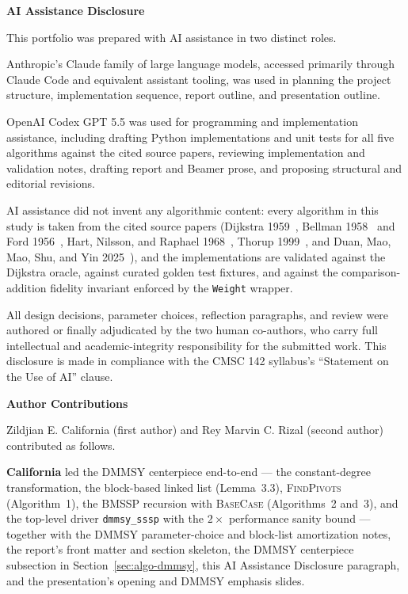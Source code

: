 \documentclass[12pt]{article}
\begin{document}
\newpage
\noindent\textbf{AI Assistance Disclosure}\label{sec:ai-disclosure}
\medskip

\begingroup
\setlength{\parskip}{6pt}

This portfolio was prepared with AI assistance in two distinct roles.

Anthropic's Claude family of large language models, accessed primarily through Claude Code and equivalent assistant tooling, was used in planning the project structure, implementation sequence, report outline, and presentation outline.

OpenAI Codex GPT 5.5 was used for programming and implementation assistance, including drafting Python implementations and unit tests for all five algorithms against the cited source papers, reviewing implementation and validation notes, drafting report and Beamer prose, and proposing structural and editorial revisions.

AI assistance did not invent any algorithmic content: every algorithm in this study is taken from the cited source papers (Dijkstra 1959~\cite{dijkstra1959note}, Bellman 1958~\cite{bellman1958routing} and Ford 1956~\cite{ford1956network}, Hart, Nilsson, and Raphael 1968~\cite{hart1968astar}, Thorup 1999~\cite{thorup1999linear}, and Duan, Mao, Mao, Shu, and Yin 2025~\cite{duan2025breaking}), and the implementations are validated against the Dijkstra oracle, against curated golden test fixtures, and against the comparison-addition fidelity invariant enforced by the \texttt{Weight} wrapper.

All design decisions, parameter choices, reflection paragraphs, and review were authored or finally adjudicated by the two human co-authors, who carry full intellectual and academic-integrity responsibility for the submitted work. This disclosure is made in compliance with the CMSC 142 syllabus's ``Statement on the Use of AI'' clause.
\par
\endgroup

\newpage
\noindent\textbf{Author Contributions}\label{sec:author-contributions}
\medskip

Zildjian E. California (first author) and Rey Marvin C. Rizal (second author) contributed as follows.
\medskip

\textbf{California} led the DMMSY centerpiece end-to-end --- the constant-degree transformation, the block-based linked list (Lemma~3.3), \textsc{FindPivots} (Algorithm~1), the \textsc{BMSSP} recursion with \textsc{BaseCase} (Algorithms~2 and~3), and the top-level driver \texttt{dmmsy\_sssp} with the $2\times$ performance sanity bound --- together with the DMMSY parameter-choice and block-list amortization notes, the report's front matter and section skeleton, the DMMSY centerpiece subsection in Section~\ref{sec:algo-dmmsy}, this AI Assistance Disclosure paragraph, and the presentation's opening and DMMSY emphasis slides.
\medskip
\end{document}
